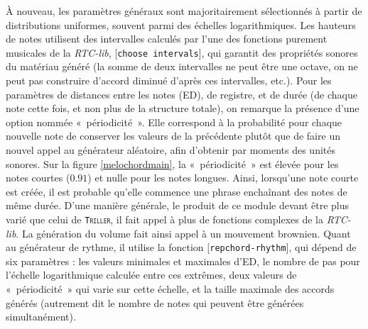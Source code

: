 \documentclass[a4paper,12pt]{article}
\newcommand{\guill}[1]{«~#1~»}
\newcommand{\module}[1]{\texttt{\textsc{#1}}}
\newcommand{\patch}[1]{[\texttt{#1}]}
\begin{document}
À nouveau, les paramètres généraux sont majoritairement sélectionnés à partir de distributions uniformes, souvent parmi des échelles logarithmiques. Les hauteurs de notes utilisent des intervalles calculés par l'une des fonctions purement musicales de la \emph{RTC-lib}, \patch{choose intervals}, qui garantit des propriétés sonores du matériau généré (la somme de deux intervalles ne peut être une octave, on ne peut pas construire d'accord diminué d'après ces intervalles, etc.). Pour les paramètres de distances entre les notes (ED), de registre, et de durée (de chaque note cette fois, et non plus de la structure totale), on remarque la présence d'une option nommée \guill{périodicité}. Elle correspond à la probabilité pour chaque nouvelle note de conserver les valeurs de la précédente plutôt que de faire un nouvel appel au générateur aléatoire, afin d'obtenir par moments des unités sonores. Sur la figure \ref{melochordmain}, la \guill{périodicité} est élevée pour les notes courtes ($0.91$) et nulle pour les notes longues. Ainsi, lorsqu'une note courte est créée, il est probable qu'elle commence une phrase enchaînant des notes de même durée. D'une manière générale, le produit de ce module devant être plus varié que celui de \module{Triller}, il fait appel à plus de fonctions complexes de la \emph{RTC-lib}. La génération du volume fait ainsi appel à un mouvement brownien. Quant au générateur de rythme, il utilise la fonction \patch{repchord-rhythm}, qui dépend de six paramètres : les valeurs minimales et maximales d'ED, le nombre de pas pour l'échelle logarithmique calculée entre ces extrêmes, deux valeurs de \guill{périodicité} qui varie sur cette échelle, et la taille maximale des accords générés (autrement dit le nombre de notes qui peuvent être générées simultanément).
\end{document}
